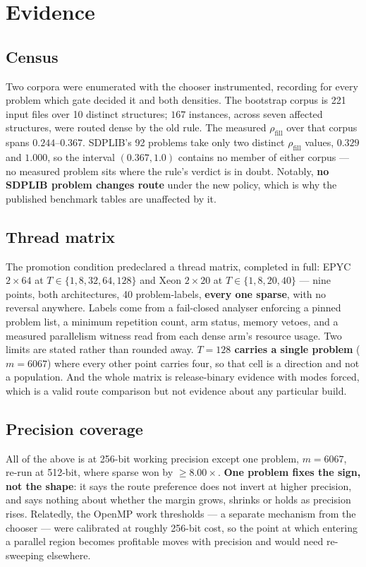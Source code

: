 \documentclass[11pt]{article}
\newcommand{\rfill}{\rho_{\mathrm{fill}}}
\begin{document}
\section{Evidence}
\label{sec:evidence}

\subsection{Census}

Two corpora were enumerated with the chooser instrumented, recording for every problem which gate
decided it and both densities. The bootstrap corpus is 221 input files over 10 distinct
structures; $167$ instances, across seven affected structures, were routed dense by the old rule.
The measured $\rfill$ over that corpus spans $0.244$--$0.367$. SDPLIB's 92 problems take only two
distinct $\rfill$ values, $0.329$ and $1.000$, so the interval $(0.367, 1.0)$ contains no member
of either corpus --- no measured problem sits where the rule's verdict is in doubt. Notably,
\textbf{no SDPLIB problem changes route} under the new policy, which is why the published
benchmark tables are unaffected by it.

\subsection{Thread matrix}

The promotion condition predeclared a thread matrix, completed in full: EPYC $2\times64$ at
$T \in \{1,8,32,64,128\}$ and Xeon $2\times20$ at $T \in \{1,8,20,40\}$ --- nine points, both
architectures, 40 problem-labels, \textbf{every one sparse}, with no reversal anywhere. Labels
come from a fail-closed analyser enforcing a pinned problem list, a minimum repetition count, arm
status, memory vetoes, and a measured parallelism witness read from each dense arm's resource
usage. Two limits are stated rather than rounded away. \textbf{$T=128$ carries a single problem}
($m=6067$) where every other point carries four, so that cell is a direction and not a population.
And the whole matrix is release-binary evidence with modes forced, which is a valid route
comparison but not evidence about any particular build.

\subsection{Precision coverage}

All of the above is at 256-bit working precision except one problem, $m=6067$, re-run at 512-bit,
where sparse won by $\ge 8.00\times$. \textbf{One problem fixes the sign, not the shape}: it says
the route preference does not invert at higher precision, and says nothing about whether the
margin grows, shrinks or holds as precision rises. Relatedly, the OpenMP work thresholds --- a
separate mechanism from the chooser --- were calibrated at roughly 256-bit cost, so the point at
which entering a parallel region becomes profitable moves with precision and would need
re-sweeping elsewhere.
\end{document}
